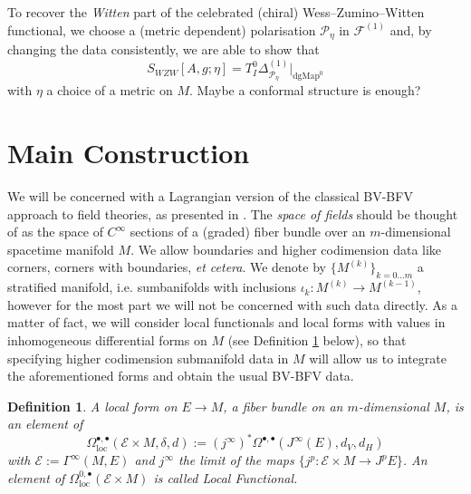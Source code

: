 \documentclass[a4paper,reqno]{amsart}
\newtheorem{definition}{Definition}
\begin{document}
To recover the \emph{Witten} part of the celebrated (chiral) Wess--Zumino--Witten functional, we choose a (metric dependent) polarisation $\mathcal{P}_\eta$ in $\mathcal{F}^{(1)}$ and, by changing the data consistently, we are able to show that
\begin{equation}
S_{WZW}[A,g;\eta]=T_{I}^0 \Delta^{(1)}_{\mathcal{P}_\eta}\vert_{\mathrm{dgMap}^0}
\end{equation}
with $\eta$ a choice of a metric on $M$. {\color{red} Maybe a conformal structure is enough?}

\section{Main Construction}
We will be concerned with a Lagrangian version of the classical BV-BFV approach to field theories, as presented in \cite{CMR1}. The \emph{space of fields} should be thought of as the space of $C^\infty$ sections of a (graded) fiber bundle over an $m$-dimensional spacetime manifold $M$. We allow boundaries and higher codimension data like corners, corners with boundaries, \emph{et cetera}. We denote by $\{M^{(k)}\}_{k=0\dots m}$ a stratified manifold, i.e. sumbanifolds with inclusions $\iota_k\colon M^{(k)} \longrightarrow M^{(k-1)}$, however for the most part we will not be concerned with such data directly. As a matter of fact, we will consider local functionals and local forms with values in inhomogeneous differential forms on $M$ (see Definition \ref{localforms} below), so that specifying higher codimension submanifold data in $M$ will allow us to integrate the aforementioned forms and obtain the usual BV-BFV data.


\begin{definition}\label{localforms}
A \emph{local} form on $E\longrightarrow M$, a fiber bundle on an $m$-dimensional $M$, is an element of 
\begin{equation}
\Omega^{\bullet,\bullet}_{\mathrm{loc}}(\mathcal{E}\times M,\delta,d) := (j^\infty)^*\Omega^{\bullet,\bullet}(J^\infty (E),d_V,d_H)
\end{equation}
with $\mathcal{E}:=\Gamma^\infty(M,E)$ and $j^\infty$ the limit of the maps $\{j^p\colon \mathcal{E}\times M \longrightarrow J^pE\}$. An element of $\Omega_{\mathrm{loc}}^{0,\bullet}(\mathcal{E}\times M)$ is called \emph{Local Functional}.
\end{definition}
\end{document}
